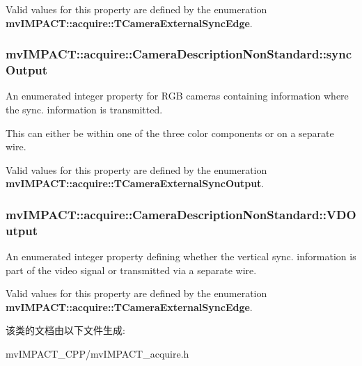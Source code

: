Valid values for this property are defined by the enumeration {\bfseries mv\+I\+M\+P\+A\+C\+T\+::acquire\+::\+T\+Camera\+External\+Sync\+Edge}. \hypertarget{classmv_i_m_p_a_c_t_1_1acquire_1_1_camera_description_non_standard_a72881ca42a2397676d6f5f7249170ecb}{
\subsubsection[{sync\+Output}]{ mv\+I\+M\+P\+A\+C\+T\+::acquire\+::\+Camera\+Description\+Non\+Standard\+::sync\+Output}}\label{classmv_i_m_p_a_c_t_1_1acquire_1_1_camera_description_non_standard_a72881ca42a2397676d6f5f7249170ecb}


An enumerated integer property for R\+G\+B cameras containing information where the sync. information is transmitted. 

This can either be within one of the three color components or on a separate wire.

Valid values for this property are defined by the enumeration {\bfseries mv\+I\+M\+P\+A\+C\+T\+::acquire\+::\+T\+Camera\+External\+Sync\+Output}. \hypertarget{classmv_i_m_p_a_c_t_1_1acquire_1_1_camera_description_non_standard_a688577153fdb465ea25854df6eb57995}{
\subsubsection[{V\+D\+Output}]{ mv\+I\+M\+P\+A\+C\+T\+::acquire\+::\+Camera\+Description\+Non\+Standard\+::\+V\+D\+Output}}\label{classmv_i_m_p_a_c_t_1_1acquire_1_1_camera_description_non_standard_a688577153fdb465ea25854df6eb57995}


An enumerated integer property defining whether the vertical sync. information is part of the video signal or transmitted via a separate wire. 

Valid values for this property are defined by the enumeration {\bfseries mv\+I\+M\+P\+A\+C\+T\+::acquire\+::\+T\+Camera\+External\+Sync\+Edge}. 

该类的文档由以下文件生成\+:\begin{DoxyCompactItemize}
\item 
mv\+I\+M\+P\+A\+C\+T\+\_\+\+C\+P\+P/mv\+I\+M\+P\+A\+C\+T\+\_\+acquire.\+h\end{DoxyCompactItemize}
